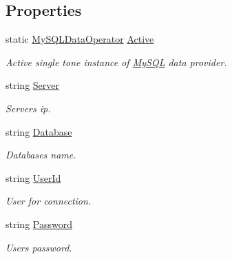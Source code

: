 \subsection*{Properties}
\begin{DoxyCompactItemize}
\item 
static \mbox{\hyperlink{class_uniform_data_operator_1_1_s_q_l_1_1_my_s_q_l_1_1_my_s_q_l_data_operator}{My\+S\+Q\+L\+Data\+Operator}} \mbox{\hyperlink{class_uniform_data_operator_1_1_s_q_l_1_1_my_s_q_l_1_1_my_s_q_l_data_operator_aa9f199b686be335bb2828893f7ad2a90}{Active}}
\begin{DoxyCompactList}\small\item\em Active single tone instance of \mbox{\hyperlink{namespace_uniform_data_operator_1_1_s_q_l_1_1_my_s_q_l}{My\+S\+QL}} data provider. \end{DoxyCompactList}\item 
string \mbox{\hyperlink{class_uniform_data_operator_1_1_s_q_l_1_1_my_s_q_l_1_1_my_s_q_l_data_operator_a14653be731b7636d2c1dd7ed31daba48}{Server}}
\begin{DoxyCompactList}\small\item\em Server\textquotesingle{}s ip. \end{DoxyCompactList}\item 
string \mbox{\hyperlink{class_uniform_data_operator_1_1_s_q_l_1_1_my_s_q_l_1_1_my_s_q_l_data_operator_a070214377e958a70594e877dba859449}{Database}}
\begin{DoxyCompactList}\small\item\em Database\textquotesingle{}s name. \end{DoxyCompactList}\item 
string \mbox{\hyperlink{class_uniform_data_operator_1_1_s_q_l_1_1_my_s_q_l_1_1_my_s_q_l_data_operator_ace67458f32cee24fd48f0cc409f4b45a}{User\+Id}}
\begin{DoxyCompactList}\small\item\em User for connection. \end{DoxyCompactList}\item 
string \mbox{\hyperlink{class_uniform_data_operator_1_1_s_q_l_1_1_my_s_q_l_1_1_my_s_q_l_data_operator_a40b331c12f0b184e3bf771a73e4c2bfd}{Password}}
\begin{DoxyCompactList}\small\item\em User\textquotesingle{}s password. \end{DoxyCompactList}\end{DoxyCompactItemize}
